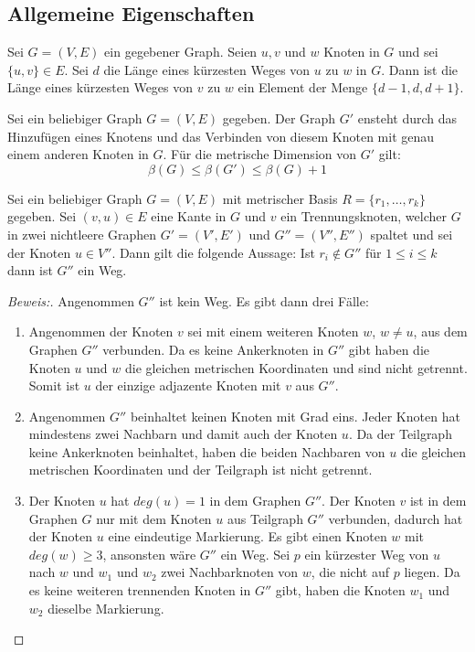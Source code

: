 \subsection{Allgemeine Eigenschaften}
\begin{lem}\cite{landmarks}
\label{dist}
Sei $G=(V,E)$ ein gegebener Graph. Seien $u,v$ und $w$ Knoten in $G$ und sei $\{u,v\}\in E$. Sei $d$ die Länge eines kürzesten Weges von $u$ zu $w$ in $G$. Dann ist die Länge eines kürzesten Weges von $v$ zu $w$ ein Element der Menge $\{d-1,d,d+1\}$.
\end{lem}
\begin{lem}
\cite{bases}
\label{einelementreichtnicht}
Sei ein beliebiger Graph $G=(V,E)$ gegeben. Der Graph $G'$ ensteht durch das Hinzufügen eines Knotens und das Verbinden von diesem Knoten mit genau einem anderen Knoten in $G$. Für die metrische Dimension von $G'$ gilt:
$$\beta(G)\leq \beta(G')\leq \beta(G)+1$$ 
\end{lem}
\begin{lem}
\label{wegtrennungsknoten}
\label{first_theorem}
Sei ein beliebiger Graph $G=(V,E)$ mit metrischer Basis $R=\{r_1, \ldots, r_k\}$ gegeben. Sei $(v,u) \in E$ eine Kante in $G$ und $v$ ein Trennungsknoten, welcher $G$ in zwei nichtleere Graphen $G'=(V',E')$ und $G'' =(V'',E'' )$ spaltet und sei der Knoten $u \in V'' $. Dann gilt die folgende Aussage:\newline
Ist $r_i \notin G''$ für $1 \leq i \leq k$ dann ist $G'' $ ein Weg.
\end{lem}
\begin{proof}[Beweis:]
Angenommen $G'' $ ist kein Weg. Es gibt dann drei Fälle:
\begin{enumerate}
\item Angenommen der Knoten $v$ sei mit einem weiteren Knoten $w$, $w \neq u$, aus dem Graphen $G'' $ verbunden. Da es keine Ankerknoten in $G'' $ gibt haben die Knoten $u$ und $w$ die gleichen metrischen Koordinaten und sind nicht getrennt. Somit ist $u$ der einzige adjazente Knoten mit $v$ aus $G''$.
\item Angenommen $G''$ beinhaltet keinen Knoten mit Grad eins. Jeder Knoten hat mindestens zwei Nachbarn und damit auch der Knoten $u$. Da der Teilgraph keine Ankerknoten beinhaltet, haben die beiden Nachbaren von $u$ die gleichen metrischen Koordinaten und der Teilgraph ist nicht getrennt.
\item Der Knoten $u$ hat $deg(u)=1$ in dem Graphen $G''$. Der Knoten $v$ ist in dem Graphen $G$ nur mit dem Knoten $u$ aus Teilgraph $G''$ verbunden, dadurch hat der Knoten $u$ eine eindeutige Markierung. Es gibt einen Knoten $w$ mit $deg(w) \geq 3$, ansonsten wäre $G''$ ein Weg. Sei $p$ ein kürzester Weg von $u$ nach $w$ und $w_1$ und $w_2$ zwei Nachbarknoten von $w$, die nicht auf $p$ liegen. Da es keine weiteren trennenden Knoten in $G''$ gibt, haben die Knoten $w_1$ und $w_2$ dieselbe Markierung.   
\end{enumerate}
\vspace{-4mm}
\end{proof}
